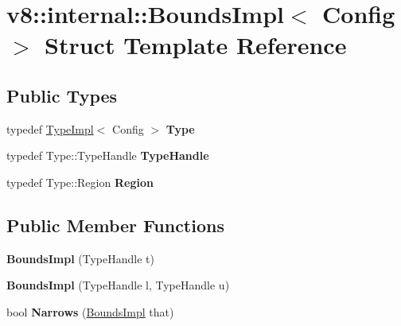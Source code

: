 \hypertarget{structv8_1_1internal_1_1_bounds_impl}{}\section{v8\+:\+:internal\+:\+:Bounds\+Impl$<$ Config $>$ Struct Template Reference}
\label{structv8_1_1internal_1_1_bounds_impl}
\subsection*{Public Types}
\begin{DoxyCompactItemize}
\item 
\hypertarget{structv8_1_1internal_1_1_bounds_impl_a934636d91c5cdf7dd0d79ab335785e9c}{}typedef \hyperlink{classv8_1_1internal_1_1_type_impl}{Type\+Impl}$<$ Config $>$ {\bfseries Type}\label{structv8_1_1internal_1_1_bounds_impl_a934636d91c5cdf7dd0d79ab335785e9c}

\item 
\hypertarget{structv8_1_1internal_1_1_bounds_impl_a5785ddd04663cd63a61e3c9834e39ae8}{}typedef Type\+::\+Type\+Handle {\bfseries Type\+Handle}\label{structv8_1_1internal_1_1_bounds_impl_a5785ddd04663cd63a61e3c9834e39ae8}

\item 
\hypertarget{structv8_1_1internal_1_1_bounds_impl_a13288e891a385b88a8f645399daafd3f}{}typedef Type\+::\+Region {\bfseries Region}\label{structv8_1_1internal_1_1_bounds_impl_a13288e891a385b88a8f645399daafd3f}

\end{DoxyCompactItemize}
\subsection*{Public Member Functions}
\begin{DoxyCompactItemize}
\item 
\hypertarget{structv8_1_1internal_1_1_bounds_impl_a2fa08ce90535e3cb78145a1a0e54e9fd}{}{\bfseries Bounds\+Impl} (Type\+Handle t)\label{structv8_1_1internal_1_1_bounds_impl_a2fa08ce90535e3cb78145a1a0e54e9fd}

\item 
\hypertarget{structv8_1_1internal_1_1_bounds_impl_a246e6cf03fac25321cbeae99a86f2aef}{}{\bfseries Bounds\+Impl} (Type\+Handle l, Type\+Handle u)\label{structv8_1_1internal_1_1_bounds_impl_a246e6cf03fac25321cbeae99a86f2aef}

\item 
\hypertarget{structv8_1_1internal_1_1_bounds_impl_ac4ad41a7bfada311b28f426c50425711}{}bool {\bfseries Narrows} (\hyperlink{structv8_1_1internal_1_1_bounds_impl}{Bounds\+Impl} that)\label{structv8_1_1internal_1_1_bounds_impl_ac4ad41a7bfada311b28f426c50425711}

\end{DoxyCompactItemize}
